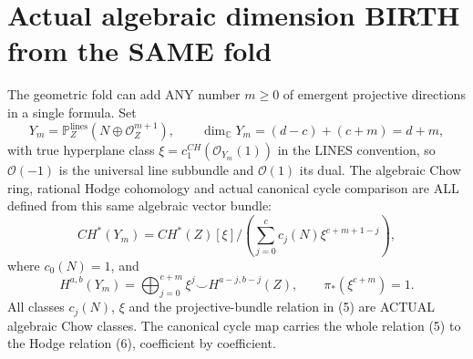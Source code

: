 \documentclass[11pt]{article}
\begin{document}
\section{Actual algebraic dimension BIRTH from the SAME fold}
The geometric fold can add ANY number $m\ge0$
of emergent projective directions in a single formula.
Set
\[
 \boxed{
 Y_m=\mathbb P_Z^{\mathrm{lines}}(N\oplus\mathcal O_Z^{m+1}),
 \qquad \dim_\mathbb C Y_m=(d-c)+(c+m)=d+m,
 }                                                       \tag{4}
\]
with true hyperplane class
$\xi=c_1^{CH}(\mathcal O_{Y_m}(1))$ in the
LINES convention, so $\mathcal O(-1)$ is the universal
line subbundle and $\mathcal O(1)$ its dual.
The algebraic Chow ring, rational Hodge cohomology and
actual canonical cycle comparison are ALL defined from
this same algebraic vector bundle:
\[
 \boxed{
 CH^*(Y_m)=
 CH^*(Z)[\xi]\big/
    \left(\sum_{j=0}^c
               c_j(N)\xi^{c+m+1-j}\right),
 }                                                       \tag{5}
\]
where $c_0(N)=1$, and
\[
 \boxed{
 H^{a,b}(Y_m)=
   \bigoplus_{j=0}^{c+m}
    \xi^j\smile H^{a-j,b-j}(Z),\qquad
 \pi_*(\xi^{c+m})=1.
 }                                                       \tag{6}
\]
All classes $c_j(N)$, $\xi$ and the projective-bundle
relation in (5) are ACTUAL algebraic Chow classes.
The canonical cycle map carries the whole relation (5)
to the Hodge relation (6), coefficient by coefficient.
\end{document}
